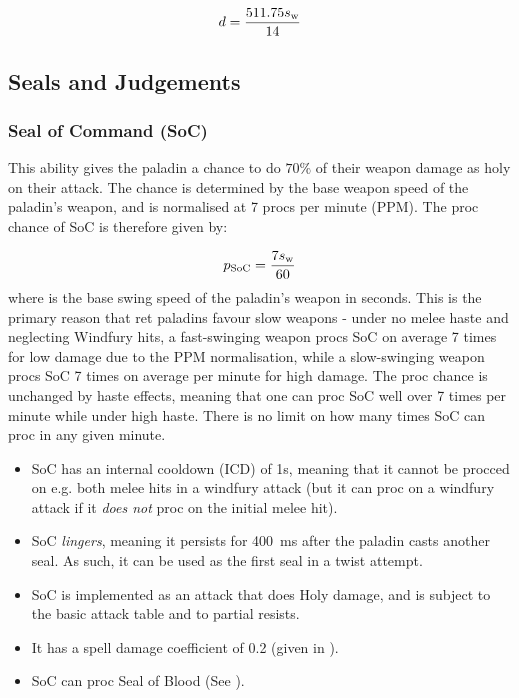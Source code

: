 \documentclass[letterpaper,11pt]{article}
\begin{document}
	\begin{equation}
		d = \frac{511.75 s_\mathrm{w} }{14}
	\end{equation}
	
	\subsection{Seals and Judgements}
		
	\subsubsection{Seal of Command (SoC)}
	This ability gives the paladin a chance to do $70\%$ of their weapon damage as holy on their attack.
	The chance is determined by the base weapon speed of the paladin's weapon, and is normalised at 7 procs per minute (PPM).
	The proc chance of SoC is therefore given by:
	
	\begin{equation}
		p_\mathrm{SoC}   = \frac{7 s_\mathrm{w} }{60}
	\end{equation}
	where \ws is the base swing speed of the paladin's weapon in seconds.
	This is the primary reason that ret paladins favour slow weapons - under no melee haste and neglecting Windfury hits, a fast-swinging weapon procs SoC on average 7 times for low damage due to the PPM normalisation, while a slow-swinging weapon procs SoC 7 times on average per minute for high damage.
	The proc chance is unchanged by haste effects, meaning that one can proc SoC well over 7 times per minute while under high haste.
	There is no limit on how many times SoC can proc in any given minute.
	
	\begin{itemize}
		\item SoC has an internal cooldown (ICD) of 1s, meaning that it cannot be procced on e.g. both melee hits in a windfury attack (but it can proc on a windfury attack if it \emph{does not} proc on the initial melee hit).
		\item SoC \emph{lingers}, meaning it persists for 400~ms after the paladin casts another seal. As such, it can be used as the first seal in a twist attempt.
		\item SoC is implemented as an attack that does Holy damage, and is subject to the basic attack table and to partial resists.
		\item It has a spell damage coefficient of 0.2 (given in ).		
		\item SoC can proc Seal of Blood (See ).		
	\end{itemize}
	
\end{document}

